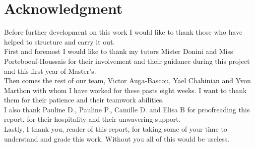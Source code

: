 \chapter*{Acknowledgment}
\quad Before further development on this work I would like to thank those who have helped to structure and carry it out.\\

First and foremost I would like to thank my tutors Mister Donini and Miss Porteboeuf-Houssais for their involvement and their guidance during this project and this first year of Master's. \\

Then comes the rest of our team, Victor Auga-Bascou, Yael Chahinian and Yvon Marthon with whom I have worked for these pasts eight weeks. I want to thank them for their patience and their teamwork abilities.\\

I also thank Pauline D., Pauline P., Camille D. and Elisa B for proofreading this report, for their hospitality and their unwavering support. \\

Lastly, I thank you, reader of this report, for taking some of your time to understand and grade this work. Without you all of this would be useless.
\newpage